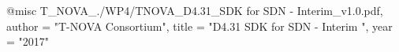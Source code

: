 @misc{ T_NOVA_./WP4/TNOVA_D4.31_SDK for SDN - Interim_v1.0.pdf,
       author = "{T-NOVA Consortium}",
       title = "D4.31 SDK for SDN - Interim ",
       year = "2017" }
